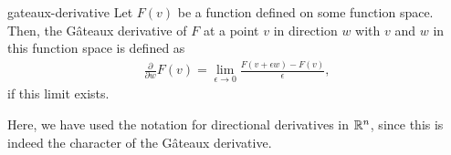 \begin{Definition}{gateaux-derivative}
  Let $F(v)$ be a function defined on some function space. Then, the Gâteaux
  derivative of $F$ at a point $v$ in direction $w$ with $v$ and $w$
  in this function space is defined as
  \begin{gather}
    \label{eq:derivatives:6}
    \frac{\partial}{\partial w} F(v)
    = \lim_{\epsilon\to 0} \frac{F(v+\epsilon w) - F(v)}{\epsilon},
  \end{gather}
  if this limit exists.
  
  Here, we have used the notation for directional derivatives in
  $\mathbb R^n$, since this is indeed the character of the Gâteaux
  derivative.
  
\end{Definition}

